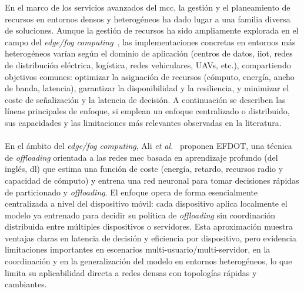 En el marco de los servicios avanzados del \gls{mcc}, la gestión y el planeamiento de recursos en entornos densos y heterogéneos ha dado lugar a una familia diversa de soluciones. Aunque la gestión de recursos ha sido ampliamente explorada en el campo del \textit{edge/fog computing}~\cite{Bachiega23}, las implementaciones concretas en entornos más heterogéneos varían según el dominio de aplicación (centros de datos, \gls{iiot}, redes de distribución eléctrica, logística, redes vehiculares, UAVs, etc.), compartiendo objetivos comunes: optimizar la asignación de recursos (cómputo, energía, ancho de banda, latencia), garantizar la disponibilidad y la resiliencia, y minimizar el coste de señalización y la latencia de decisión. A continuación se describen las líneas principales de enfoque, si emplean un enfoque centralizado o distribuido, sus capacidades y las limitaciones más relevantes observadas en la literatura.\\
\\
En el ámbito del \textit{edge/fog computing}, Ali \textit{et al.}~\cite{Ali21} proponen EFDOT, una técnica de \textit{offloading} orientada a las redes \gls{mec} basada en aprendizaje profundo (del inglés, \gls{dl}) que estima una función de coste (energía, retardo, recursos radio y capacidad de cómputo) y entrena una red neuronal para tomar decisiones rápidas de particionado y \textit{offloading}. El enfoque opera de forma esencialmente centralizada a nivel del dispositivo móvil: cada dispositivo aplica localmente el modelo ya entrenado para decidir su política de \textit{offloading} sin coordinación distribuida entre múltiples dispositivos o servidores. Esta aproximación muestra ventajas claras en latencia de decisión y eficiencia por dispositivo, pero evidencia limitaciones importantes en escenarios multi-usuario/multi-servidor, en la coordinación y en la generalización del modelo en entornos heterogéneos, lo que limita su aplicabilidad directa a redes densas con topologías rápidas y cambiantes. \\
\\
